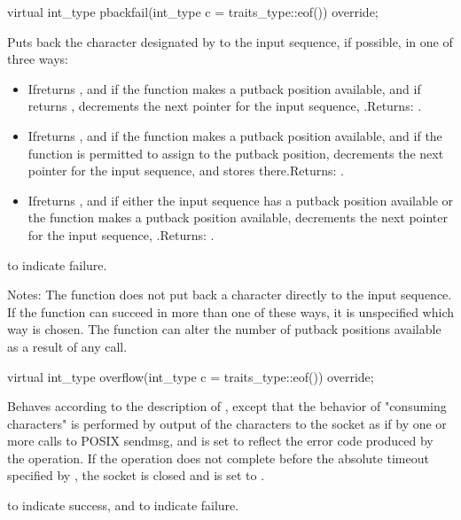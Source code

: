 \begin{itemdecl}
virtual int_type pbackfail(int_type c = traits_type::eof()) override;
\end{itemdecl}

\begin{itemdescr}
\pnum
\effects Puts back the character designated by  to the input sequence, if possible, in one of three ways:

\begin{itemize}
\item
Ifreturns , and if the function makes a putback position available, and if returns , decrements the next pointer for the input sequence, .Returns: .

\item
Ifreturns , and if the function makes a putback position available, and if the function is permitted to assign to the putback position, decrements the next pointer for the input sequence, and stores there.Returns: .

\item
Ifreturns , and if either the input sequence has a putback position available or the function makes a putback position available, decrements the next pointer for the input sequence, .Returns: .
\end{itemize}

\pnum
\returns {} to indicate failure.

\pnum
Notes: The function does not put back a character directly to the input sequence. If the function can succeed in more than one of these ways, it is unspecified which way is chosen. The function can alter the number of putback positions available as a result of any call.
\end{itemdescr}

\begin{itemdecl}
virtual int_type overflow(int_type c = traits_type::eof()) override;
\end{itemdecl}

\begin{itemdescr}
\pnum
\effects Behaves according to the description of , except that the behavior of "consuming characters" is performed by output of the characters to the socket as if by one or more calls to POSIX sendmsg, and  is set to reflect the error code produced by the operation. If the operation does not complete before the absolute timeout specified by , the socket is closed and  is set to .

\pnum
\returns {} to indicate success, and  to indicate failure.
\end{itemdescr}


